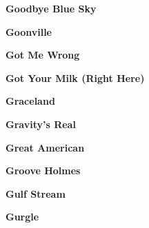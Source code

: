 \vspace{10pt} 
\begin{center}\textbf{Goodbye Blue Sky}\end{center}
\newline
\vspace{10pt} 
\begin{center}\textbf{Goonville}\end{center}
\newline
\vspace{10pt} 
\begin{center}\textbf{Got Me Wrong}\end{center}
\newline
\vspace{10pt} 
\begin{center}\textbf{Got Your Milk (Right Here)}\end{center}
\newline
\vspace{10pt} 
\begin{center}\textbf{Graceland}\end{center}
\newline
\vspace{10pt} 
\begin{center}\textbf{Gravity's Real}\end{center}
\newline
\vspace{10pt} 
\begin{center}\textbf{Great American}\end{center}
\newline
\vspace{10pt} 
\begin{center}\textbf{Groove Holmes}\end{center}
\newline
\vspace{10pt} 
\begin{center}\textbf{Gulf Stream}\end{center}
\newline
\vspace{10pt} 
\begin{center}\textbf{Gurgle}\end{center}

